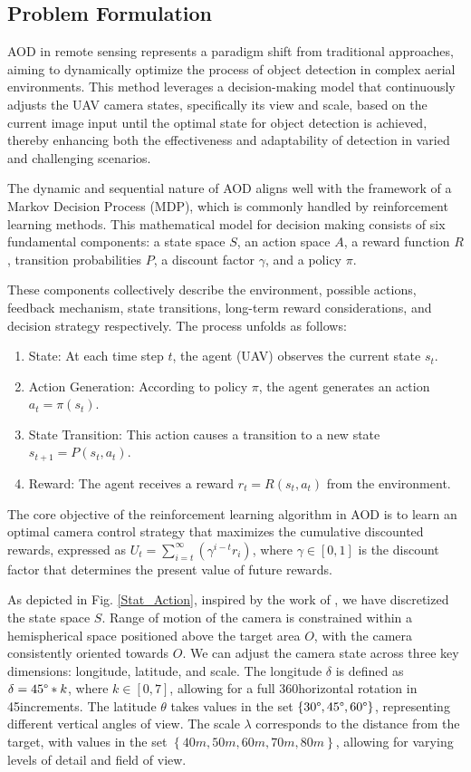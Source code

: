 \documentclass[lettersize,journal]{IEEEtran}
\begin{document}
\subsection{Problem Formulation}
AOD in remote sensing represents a paradigm shift from traditional approaches, aiming to dynamically optimize the process of object detection in complex aerial environments. This method leverages a decision-making model that continuously adjusts the UAV camera states, specifically its view and scale, based on the current image input until the optimal state for object detection is achieved, thereby enhancing both the effectiveness and adaptability of detection in varied and challenging scenarios.

The dynamic and sequential nature of AOD aligns well with the framework of a Markov Decision Process (MDP), which is commonly handled by reinforcement learning methods. This mathematical model for decision making consists of six fundamental components: a state space $S$, an action space $A$, a reward function $R$, transition probabilities $P$, a discount factor $\gamma$, and a policy $\pi$. 

These components collectively describe the environment, possible actions, feedback mechanism, state transitions, long-term reward considerations, and decision strategy respectively. The process unfolds as follows:
\begin{enumerate}
\item{State: At each time step $t$, the agent (UAV) observes the current state $s_t$.}
\item{Action Generation: According to policy $\pi$, the agent generates an action $a_t = \pi(s_t)$.}
\item{State Transition: This action causes a transition to a new state $s_{t+1} = P(s_t, a_t)$.}
\item{Reward: The agent receives a reward $r_t = R(s_t, a_t)$ from the environment.}
\end{enumerate}

The core objective of the reinforcement learning algorithm in AOD is to learn an optimal camera control strategy that maximizes the cumulative discounted rewards, expressed as $U_t = \sum_{i=t}^{\infty}{\left( \gamma ^{i-t}r_i \right)}$, where $\gamma \in [0,1]$ is the discount factor that determines the present value of future rewards.

As depicted in Fig. \ref{Stat_Action}, inspired by the work of \cite{dynamic2021}, we have discretized the state space $S$. Range of motion of the camera is constrained within a hemispherical space positioned above the target area $O$, with the camera consistently oriented towards $O$. We can adjust the camera state across three key dimensions: longitude, latitude, and scale. The longitude $\delta$ is defined as $\delta = 45\degree * k$, where $k \in [0,7]$, allowing for a full 360\degree horizontal rotation in 45\degree increments. The latitude $\theta$ takes values in the set $\left\{30\degree, 45\degree, 60\degree \right\}$, representing different vertical angles of view. The scale $\lambda$ corresponds to the distance from the target, with values in the set $\left\{40m, 50m, 60m, 70m, 80m \right\}$, allowing for varying levels of detail and field of view.
\end{document}
